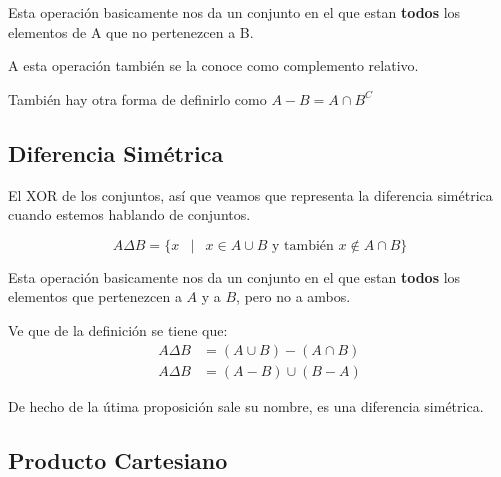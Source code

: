 \documentclass[12pt]{report}                                    %
\DeclareMathOperator \Space {\quad}                             %
\DeclareMathOperator \MiniSpace {\;}                            %
\newcommand \Such {\MiniSpace|\MiniSpace}                       %
\begin{document}
                Esta operación basicamente nos da un conjunto en el que estan \textbf{todos} los elementos
                de A que no pertenezcen a B.

                A esta operación también se la conoce como complemento relativo.

                También hay otra forma de definirlo como $A - B = A \cap B^C$



            \clearpage
            \subsection{Diferencia Simétrica}

                El XOR de los conjuntos, así que veamos que representa la diferencia simétrica cuando estemos
                hablando de conjuntos.

                \begin{equation}
                    A \Delta B = \{ x \Such x \in A \cup B \text{ y también }  x \notin A \cap B \}
                \end{equation}

                Esta operación basicamente nos da un conjunto en el que estan \textbf{todos} los elementos
                que pertenezcen a $A$ y a $B$, pero no a ambos.

                Ve que de la definición se tiene que:
                \begin{equation*}
                \begin{split}
                    A \Delta B &= (A \cup B) - ( A \cap B) \\
                    A \Delta B &= (A - B) \cup ( B - A)
                \end{split}
                \end{equation*}

                De hecho de la útima proposición sale su nombre, es una diferencia simétrica.


            \clearpage
            \subsection{Producto Cartesiano}
\end{document}
